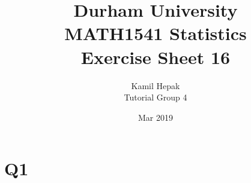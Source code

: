 \documentclass[]{article}
\title{\vspace{-3cm}Durham University\\
    MATH1541 Statistics \\
	Exercise Sheet 16}
\author{Kamil Hepak\\
        Tutorial Group 4}
\date{Mar 2019}
\begin{document}
\maketitle

\section{Q1}
\end{document}
